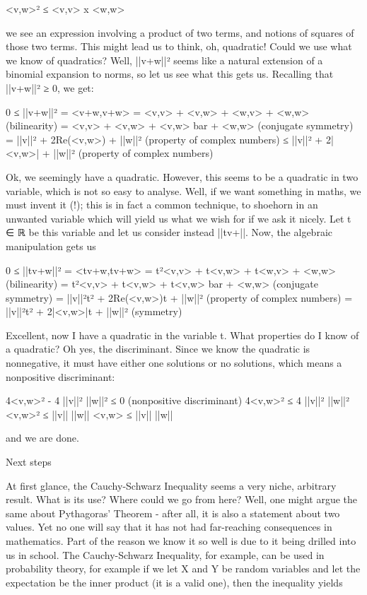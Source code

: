 <v,w>² ≤ <v,v> x <w,w>

we see an expression involving a product of two terms, and notions of squares of those two terms. This might lead us to think, oh, quadratic! Could we use what we know of quadratics? Well, ||v+w||² seems like a natural extension of a binomial expansion to norms, so let us see what this gets us. Recalling that ||v+w||² ≥ 0, we get:

0 ≤ ||v+w||²
    = <v+w,v+w>
    = <v,v> + <v,w> + <w,v> + <w,w> (bilinearity)
    = <v,v> + <v,w> + <v,w> bar + <w,w> (conjugate symmetry)
    = ||v||² + 2Re(<v,w>) + ||w||² (property of complex numbers)
    ≤ ||v||² + 2|<v,w>| + ||w||² (property of complex numbers)

Ok, we seemingly have a quadratic. However, this seems to be a quadratic in two variable, which is not so easy to analyse. Well, if we want something in maths, we must invent it (!); this is in fact a common technique, to shoehorn in an unwanted variable which will yield us what we wish for if we ask it nicely. Let t ∈ ℝ be this variable and let us consider instead ||tv+||. Now, the algebraic manipulation gets us

0 ≤ ||tv+w||²
    = <tv+w,tv+w>
    = t²<v,v> + t<v,w> + t<w,v> + <w,w> (bilinearity)
    = t²<v,v> + t<v,w> + t<v,w> bar + <w,w> (conjugate symmetry)
    = ||v||²t² + 2Re(<v,w>)t + ||w||² (property of complex numbers)
    = ||v||²t² + 2|<v,w>|t + ||w||² (symmetry)

Excellent, now I have a quadratic in the variable t. What properties do I know of a quadratic? Oh yes, the discriminant. Since we know the quadratic is nonnegative, it must have either one solutions or no solutions, which means a nonpositive discriminant:

4<v,w>² - 4 ||v||² ||w||² ≤ 0 (nonpositive discriminant)
4<v,w>² ≤ 4 ||v||² ||w||²
<v,w>² ≤ ||v|| ||w||
<v,w> ≤ ||v|| ||w||

and we are done.

Next steps

At first glance, the Cauchy-Schwarz Inequality seems a very niche, arbitrary result. What is its use? Where could we go from here? Well, one might argue the same about Pythagoras’ Theorem - after all, it is also a statement about two values. Yet no one will say that it has not had far-reaching consequences in mathematics. Part of the reason we know it so well is due to it being drilled into us in school. The Cauchy-Schwarz Inequality, for example, can be used in probability theory, for example if we let X and Y be random variables and let the expectation be the inner product (it is a valid one), then the inequality yields

